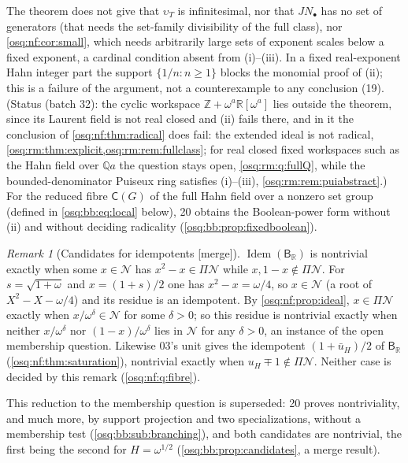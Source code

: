 \documentclass[11pt,letterpaper]{article}
\numberwithin{equation}{section}
\theoremstyle{definition}
\theoremstyle{remark}
\newtheorem{remark}[remark]{Remark}
\theoremstyle{plain}
\newcommand{\Z}{\mathbb Z}
\newcommand{\Q}{\mathbb Q}
\newcommand{\R}{\mathbb R}
\newcommand{\NN}{\mathcal N}         %
\newcommand{\Idem}{\operatorname{Idem}}
\newcommand{\merge}{\textup{\textsf{[merge]}}}
\begin{document}
The theorem does not give that $\upsilon_T$ is infinitesimal, nor that $JN_\bullet$ has no set of generators (that needs the set-family divisibility of
the full class), nor \cref{osq:nf:cor:small}, which needs arbitrarily large sets of exponent scales below a fixed exponent, a cardinal condition absent
from (i)--(iii). In a fixed real-exponent Hahn integer part the support $\{1/n:n\ge1\}$ blocks the monomial proof of (ii); this is a failure of the
argument, not a counterexample to any conclusion (19). (Status (batch 32): the cyclic workspace $\Z+\omega^a\R[\omega^a]$ lies outside the
theorem, since its Laurent field is not real closed and (ii) fails there, and in it the conclusion of \cref{osq:nf:thm:radical} does fail:
the extended ideal is not radical, \cref{osq:rm:thm:explicit,osq:rm:rem:fullclass}; for real closed fixed workspaces such as the Hahn field
over $\Q a$ the question stays open, \cref{osq:rm:q:fullQ}, while the bounded-denominator Puiseux ring satisfies (i)--(iii),
\cref{osq:rm:rem:puiabstract}.) For the reduced fibre $\mathsf C(G)$ of the full Hahn field over a nonzero set group
(defined in \eqref{osq:bb:eq:local} below), 20 obtains the Boolean-power form without (ii) and without deciding radicality (\cref{osq:bb:prop:fixedboolean}).

\begin{remark}[Candidates for idempotents \merge]\label{osq:nf:rem:candidates}
$\Idem(\mathsf B_\R)$ is nontrivial exactly when some $x\in\NN$ has $x^2-x\in\Pi\NN$ while $x,1-x\notin\Pi\NN$. For $s=\sqrt{1+\omega}$ and
$x=(1+s)/2$ one has $x^2-x=\omega/4$, so $x\in\NN$ (a root of $X^2-X-\omega/4$) and its residue is an idempotent. By
\cref{osq:nf:prop:ideal}, $x\in\Pi\NN$ exactly when $x/\omega^\delta\in\NN$ for some $\delta>0$; so this residue is nontrivial exactly when neither
$x/\omega^\delta$ nor $(1-x)/\omega^\delta$ lies in $\NN$ for any $\delta>0$, an instance of the open membership question. Likewise 03's unit gives the
idempotent $(1+\bar u_H)/2$ of $\mathsf B_\R$ (\cref{osq:nf:thm:saturation}), nontrivial exactly when $u_H\mp1\notin\Pi\NN$. Neither case is decided by this
remark (\cref{osq:nf:q:fibre}).
\end{remark}

This reduction to the membership question is superseded: 20 proves nontriviality, and much more, by support projection and
two specializations, without a membership test (\cref{osq:bb:sub:branching}), and both candidates are nontrivial, the first
being the second for $H=\omega^{1/2}$ (\cref{osq:bb:prop:candidates}, a merge result).
\end{document}
